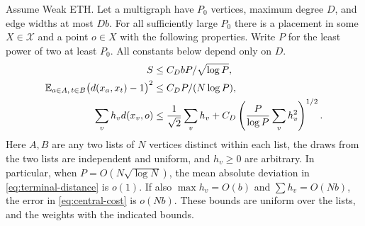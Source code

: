 \begin{lemma}\label{lem:geometry}
Assume Weak ETH. Let a multigraph have $P_0$ vertices, maximum
degree $D$, and edge widths at most $Db$. For all sufficiently large $P_0$
there is a placement in some $X\in\mathcal X$ and a point $o\in X$ with
the following properties. Write $P$ for the least power of two at least
$P_0$. All constants below depend only on $D$.
\begin{align}
 S &\le C_D bP/\sqrt{\log P},                                           \label{eq:short-supply}\\
 \mathbb E_{a\in A,\,t\in B}\bigl(d(x_a,x_t)-1\bigr)^2
   &\le C_D P/(N\log P),                                                \label{eq:terminal-distance}\\
 \sum_v h_v d(x_v,o)
   &\le \frac1{\sqrt2}\sum_v h_v+
       C_D\left(\frac{P}{\log P}\sum_v h_v^2\right)^{1/2}.             \label{eq:central-cost}
\end{align}
Here $A,B$ are any two lists of $N$ vertices distinct within each list,
the draws from the two lists are independent and uniform, and $h_v\ge0$
are arbitrary. In particular, when $P=O(N\sqrt{\log N})$,
the mean absolute deviation in \eqref{eq:terminal-distance} is $o(1)$.
If also $\max h_v=O(b)$ and $\sum h_v=O(Nb)$, the error in
\eqref{eq:central-cost} is $o(Nb)$. These bounds are uniform over the lists, and the weights with the indicated bounds.
\end{lemma}


